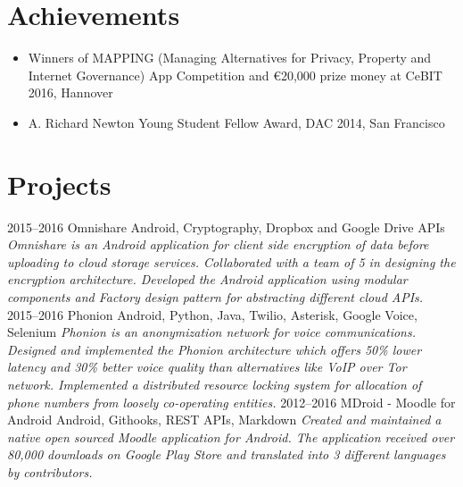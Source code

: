 \documentclass[]{friggeri-cv}
\begin{document}
\section{Achievements}
\begin{itemize}
  \item Winners of MAPPING (Managing Alternatives for Privacy, Property and Internet Governance) App Competition and \euro 20,000 prize money at CeBIT 2016, Hannover
  \item A. Richard Newton Young Student Fellow Award, DAC 2014, San Francisco
\end{itemize}
\vspace{0.3cm}

\section{Projects}
\begin{entrylist}
  \entry
    {2015–2016}
    {Omnishare}
    {Android, Cryptography, Dropbox and Google Drive APIs}
    {\emph{Omnishare is an Android application for client side encryption of data before uploading to cloud storage services. Collaborated with a team of 5 in designing the encryption architecture. Developed the Android application using modular components and Factory design pattern for abstracting different cloud APIs.}}
  \entry
    {2015–2016}
    {Phonion}
    {Android, Python, Java, Twilio, Asterisk, Google Voice, Selenium}
    {\emph{Phonion is an anonymization network for voice communications. Designed and implemented the Phonion architecture which offers 50\% lower latency and 30\% better voice quality than alternatives like VoIP over Tor network. Implemented a distributed resource locking system for allocation of phone numbers from loosely co-operating entities.}}
  \entry
    {2012–2016}
    {MDroid - Moodle for Android}
    {Android, Githooks, REST APIs, Markdown}
    {\emph{Created and maintained a native open sourced Moodle application for Android. The application received over 80,000 downloads on Google Play Store and translated into 3 different languages by contributors.}}
\end{entrylist}
\end{document}
